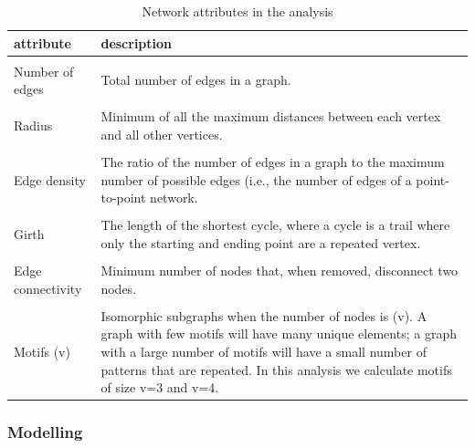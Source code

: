 \documentclass[preprint, 3p,
authoryear]{elsarticle} %
\begin{document}
\begin{longtable}[t]{l>{\raggedright\arraybackslash}p{40em}}
\caption{\label{tab:network-attributes-descriptive-table}\label{tab:network-attributes}Network attributes in the analysis}\\
\toprule
attribute & description\\
\midrule
\cellcolor{gray!10}{Number of vertices} & \cellcolor{gray!10}{The total number of vertices in a graph.}\\
Number of edges & Total number of edges in a graph.\\
\cellcolor{gray!10}{Diameter} & \cellcolor{gray!10}{The longest shortest path in a graph, akin to the longest segment of a line that cuts a circle.}\\
Radius & Minimum of all the maximum distances between each vertex and all other vertices.\\
\cellcolor{gray!10}{Global efficiency} & \cellcolor{gray!10}{The average of the inverse distances between all pairs of vertices.}\\
\addlinespace
Edge density & The ratio of the number of edges in a graph to the maximum number of possible edges (i.e., the number of edges of a point-to-point network.\\
\cellcolor{gray!10}{Mean distance} & \cellcolor{gray!10}{Mean length of all shortest paths from each vertex.}\\
Girth & The length of the shortest cycle, where a cycle is a trail where only the starting and ending point are a repeated vertex.\\
\cellcolor{gray!10}{Minimum cut} & \cellcolor{gray!10}{The smallest number of edges that, when removed, separate a graph into two or more components.}\\
Edge connectivity & Minimum number of nodes that, when removed, disconnect two nodes.\\
\addlinespace
\cellcolor{gray!10}{Transitivity} & \cellcolor{gray!10}{Probability that a vertex neighbors are neighbors between them.}\\
Motifs (v) & Isomorphic subgraphs when the number of nodes is (v). A graph with few motifs will have many unique elements; a graph with a large number of motifs will have a small number of patterns that are repeated. In this analysis we calculate motifs of size v=3 and v=4.\\
\bottomrule
\end{longtable}
\endgroup{}

\subsubsection{Modelling}\label{modelling}
\end{document}
